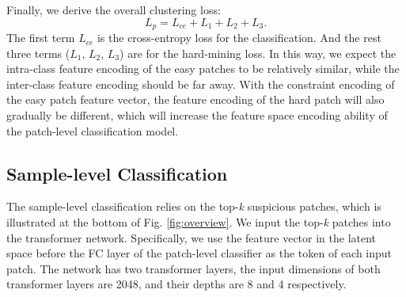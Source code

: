 Finally, we derive the overall clustering loss:
\begin{equation}
L_{p}=L_{ce}+L_{1} + L_{2} + L_{3}.
\end{equation}
The first term $L_{ce}$ is the cross-entropy loss for the classification. And the rest three terms ($L_{1}$, $L_{2}$, $L_{3}$) are for the hard-mining loss.
In this way, we expect the intra-class feature encoding of the easy patches to be relatively similar, while the inter-class feature encoding should be far away. 
With the constraint encoding of the easy patch feature vector, the feature encoding of the hard patch will also gradually be different, which will increase the feature space encoding ability of the patch-level classification model.





\subsection{Sample-level Classification}
\label{section-3-3}

The sample-level classification relies on the top-\textit{k} suspicious patches, which is illustrated at the bottom of Fig. \ref{fig:overview}. 
We input the top-\textit{k} patches into the transformer network. 
Specifically, we use the feature vector in the latent space before the FC layer of the patch-level classifier as the token of each input patch.
The network has two transformer layers, the input dimensions of both transformer layers are 2048, and their depths are 8 and 4 respectively. 

